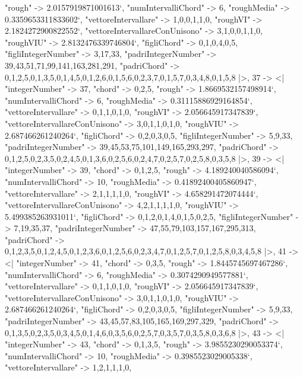 \documentclass[
]{article}
\begin{document}
\begin{DatasetVerbatim}
    "rough" -> 2.0157919871001613`,
    "numIntervalliChord" -> 6,
    "roughMedia" -> 0.3359653311833602`,
    "vettoreIntervallare" -> {1,0,0,1,1,0},
    "roughVI" -> 2.1824272900822552`,
    "vettoreIntervallareConUnisono" -> {3,1,0,0,1,1,0},
    "roughVIU" -> 2.8132476339746804`,
    "figliChord" -> {{0,1},{0,4},{0,5}},
    "figliIntegerNumber" -> {3,17,33},
    "padriIntegerNumber" -> {39,43,51,71,99,141,163,281,291},
    "padriChord" -> {{0,1,2,5},{0,1,3,5},{0,1,4,5},{0,1,2,6},{0,1,5,6},{0,2,3,7},{0,1,5,7},{0,3,4,8},{0,1,5,8}}
  |>,
  37 -> <|
    "integerNumber" -> 37,
    "chord" -> {0,2,5},
    "rough" -> 1.8669532157498914`,
    "numIntervalliChord" -> 6,
    "roughMedia" -> 0.31115886929164854`,
    "vettoreIntervallare" -> {0,1,1,0,1,0},
    "roughVI" -> 2.056645917347839`,
    "vettoreIntervallareConUnisono" -> {3,0,1,1,0,1,0},
    "roughVIU" -> 2.687466261240264`,
    "figliChord" -> {{0,2},{0,3},{0,5}},
    "figliIntegerNumber" -> {5,9,33},
    "padriIntegerNumber" -> {39,45,53,75,101,149,165,293,297},
    "padriChord" -> {{0,1,2,5},{0,2,3,5},{0,2,4,5},{0,1,3,6},{0,2,5,6},{0,2,4,7},{0,2,5,7},{0,2,5,8},{0,3,5,8}}
  |>,
  39 -> <|
    "integerNumber" -> 39,
    "chord" -> {0,1,2,5},
    "rough" -> 4.189240040586094`,
    "numIntervalliChord" -> 10,
    "roughMedia" -> 0.41892400405860947`,
    "vettoreIntervallare" -> {2,1,1,1,1,0},
    "roughVI" -> 4.658291472074444`,
    "vettoreIntervallareConUnisono" -> {4,2,1,1,1,1,0},
    "roughVIU" -> 5.499385263931011`,
    "figliChord" -> {{0,1,2},{0,1,4},{0,1,5},{0,2,5}},
    "figliIntegerNumber" -> {7,19,35,37},
    "padriIntegerNumber" -> {47,55,79,103,157,167,295,313},
    "padriChord" -> {{0,1,2,3,5},{0,1,2,4,5},{0,1,2,3,6},{0,1,2,5,6},{0,2,3,4,7},{0,1,2,5,7},{0,1,2,5,8},{0,3,4,5,8}}
  |>,
  41 -> <|
    "integerNumber" -> 41,
    "chord" -> {0,3,5},
    "rough" -> 1.8445745697467286`,
    "numIntervalliChord" -> 6,
    "roughMedia" -> 0.3074290949577881`,
    "vettoreIntervallare" -> {0,1,1,0,1,0},
    "roughVI" -> 2.056645917347839`,
    "vettoreIntervallareConUnisono" -> {3,0,1,1,0,1,0},
    "roughVIU" -> 2.687466261240264`,
    "figliChord" -> {{0,2},{0,3},{0,5}},
    "figliIntegerNumber" -> {5,9,33},
    "padriIntegerNumber" -> {43,45,57,83,105,165,169,297,329},
    "padriChord" -> {{0,1,3,5},{0,2,3,5},{0,3,4,5},{0,1,4,6},{0,3,5,6},{0,2,5,7},{0,3,5,7},{0,3,5,8},{0,3,6,8}}
  |>,
  43 -> <|
    "integerNumber" -> 43,
    "chord" -> {0,1,3,5},
    "rough" -> 3.9855230290053374`,
    "numIntervalliChord" -> 10,
    "roughMedia" -> 0.3985523029005338`,
    "vettoreIntervallare" -> {1,2,1,1,1,0},

\end{DatasetVerbatim}
\end{document}
